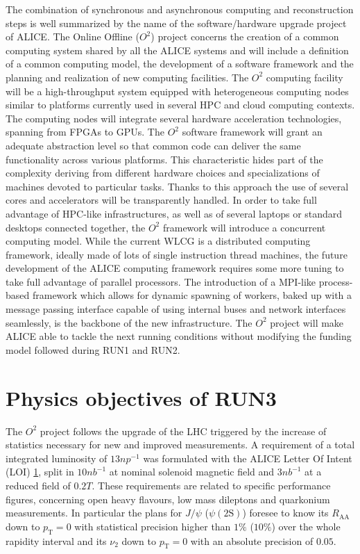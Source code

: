 The combination of synchronous and asynchronous computing and reconstruction steps is well summarized by the name of the software/hardware upgrade project of ALICE.
The Online Offline ($O^2$) project concerns the creation of a common computing system shared by all the ALICE systems and will include a definition of a common computing model, the development of a software framework and the planning and realization of new computing facilities.
The $O^2$ computing facility will be a high-throughput system equipped with heterogeneous computing nodes similar to platforms currently used in several HPC and cloud computing contexts.
The computing nodes will integrate several hardware acceleration technologies, spanning from FPGAs to GPUs.
The $O^2$ software framework will grant an adequate abstraction level so that common code can deliver the same functionality across various platforms.
This characteristic hides part of the complexity deriving from different hardware choices and specializations of machines devoted to particular tasks.
Thanks to this approach the use of several cores and accelerators will be transparently handled.
In order to take full advantage of HPC-like infrastructures, as well as of several laptops or standard desktops connected together, the $O^2$ framework will introduce a concurrent computing model.
While the current WLCG is a distributed computing framework, ideally made of lots of single instruction thread machines, the future development of the ALICE computing framework requires some more tuning to take full advantage of parallel processors.
The introduction of a MPI-like process-based framework which allows for dynamic spawning of workers, baked up with a message passing interface capable of using internal buses and network interfaces seamlessly, is the backbone of the new infrastructure.
The $O^2$ project will make ALICE able to tackle the next running conditions without modifying the funding model followed during RUN1 and RUN2.

\section{Physics objectives of RUN3}
The $O^2$ project follows the upgrade of the LHC triggered by the increase of statistics necessary for new and improved measurements.
A requirement of a total integrated luminosity of $13 np^{-1}$ was formulated with the ALICE Letter Of Intent (LOI) \ref{}, split in $10 nb^{-1}$ at nominal solenoid magnetic field and $3 nb^{-1}$ at a reduced field of $0.2T$.
These requirements are related to specific performance figures, concerning open heavy flavours, low mass dileptons and quarkonium measurements.
In particular the plans for $J/\psi$ ($\psi(\mathrm{2S})$) foresee to know its $R_{\mathrm{AA}}$ down to $p_{\mathrm{T}} = 0$ with statistical precision higher than $1\%$ ($10\%$) over the whole rapidity interval and its $\nu_2$ down to $p_{\mathrm{T}} = 0$ with an absolute precision of $0.05$.

